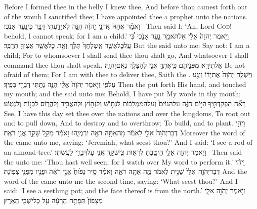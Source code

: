 {Before I formed thee in the belly I knew thee, And before thou camest forth out of the womb I sanctified thee; I have appointed thee a prophet unto the nations.}
{וָאֹמַ֗ר אֲהָהּ֙ אֲדֹנָ֣י יֱהֹוִ֔ה הִנֵּ֥ה לֹֽא\maqqaf יָדַ֖עְתִּי דַּבֵּ֑ר כִּי\maqqaf נַ֖עַר אָנֹֽכִי׃ \setuma }
{Then said I: ‘Ah, Lord \textsc{God}! behold, I cannot speak; for I am a child.’}
{וַיֹּ֤אמֶר יְהֹוָה֙ אֵלַ֔י אַל\maqqaf תֹּאמַ֖ר נַ֣עַר אָנֹ֑כִי כִּ֠י עַֽל\maqqaf כׇּל\maqqaf אֲשֶׁ֤ר אֶֽשְׁלָחֲךָ֙ תֵּלֵ֔ךְ וְאֵ֛ת כׇּל\maqqaf אֲשֶׁ֥ר אֲצַוְּךָ֖ תְּדַבֵּֽר׃}
{But the \lord\space said unto me: Say not: I am a child; For to whomsoever I shall send thee thou shalt go, And whatsoever I shall command thee thou shalt speak.}
{אַל\maqqaf תִּירָ֖א מִפְּנֵיהֶ֑ם כִּֽי\maqqaf אִתְּךָ֥ אֲנִ֛י לְהַצִּלֶ֖ךָ נְאֻם\maqqaf יְהֹוָֽה׃}
{Be not afraid of them; For I am with thee to deliver thee, Saith the \lord.}
{וַיִּשְׁלַ֤ח יְהֹוָה֙ אֶת\maqqaf יָד֔וֹ וַיַּגַּ֖ע עַל\maqqaf פִּ֑י וַיֹּ֤אמֶר יְהֹוָה֙ אֵלַ֔י הִנֵּ֛ה נָתַ֥תִּי דְבָרַ֖י בְּפִֽיךָ׃}
{Then the \lord\space put forth His hand, and touched my mouth; and the \lord\space said unto me: Behold, I have put My words in thy mouth;}
{רְאֵ֞ה הִפְקַדְתִּ֣יךָ \legarmeh  הַיּ֣וֹם הַזֶּ֗ה עַל\maqqaf הַגּוֹיִם֙ וְעַל\maqqaf הַמַּמְלָכ֔וֹת לִנְת֥וֹשׁ וְלִנְת֖וֹץ וּלְהַאֲבִ֣יד וְלַהֲר֑וֹס לִבְנ֖וֹת וְלִנְטֽוֹעַ׃ \petucha }
{See, I have this day set thee over the nations and over the kingdoms, To root out and to pull down, And to destroy and to overthrow; To build, and to plant.}
{וַיְהִ֤י דְבַר\maqqaf יְהֹוָה֙ אֵלַ֣י לֵאמֹ֔ר מָה\maqqaf אַתָּ֥ה רֹאֶ֖ה יִרְמְיָ֑הוּ וָאֹמַ֕ר מַקֵּ֥ל שָׁקֵ֖ד אֲנִ֥י רֹאֶֽה׃}
{Moreover the word of the \lord\space came unto me, saying: ‘Jeremiah, what seest thou?’ And I said: ‘I see a rod of an almond-tree.’}
{וַיֹּ֧אמֶר יְהֹוָ֛ה אֵלַ֖י הֵיטַ֣בְתָּ לִרְא֑וֹת כִּֽי\maqqaf שֹׁקֵ֥ד אֲנִ֛י עַל\maqqaf דְּבָרִ֖י לַעֲשֹׂתֽוֹ׃ \setuma }
{Then said the \lord\space unto me: ‘Thou hast well seen; for I watch over My word to perform it.’}
{וַיְהִ֨י דְבַר\maqqaf יְהֹוָ֤ה \pasek  אֵלַי֙ שֵׁנִ֣ית לֵאמֹ֔ר מָ֥ה אַתָּ֖ה רֹאֶ֑ה וָאֹמַ֗ר סִ֤יר נָפ֙וּחַ֙ אֲנִ֣י רֹאֶ֔ה וּפָנָ֖יו מִפְּנֵ֥י צָפֽוֹנָה׃}
{And the word of the \lord\space came unto me the second time, saying: ‘What seest thou?’ And I said: ‘I see a seething pot; and the face thereof is from the north.’}
{וַיֹּ֥אמֶר יְהֹוָ֖ה אֵלָ֑י מִצָּפוֹן֙ תִּפָּתַ֣ח הָרָעָ֔ה עַ֥ל כׇּל\maqqaf יֹשְׁבֵ֖י הָאָֽרֶץ׃}
